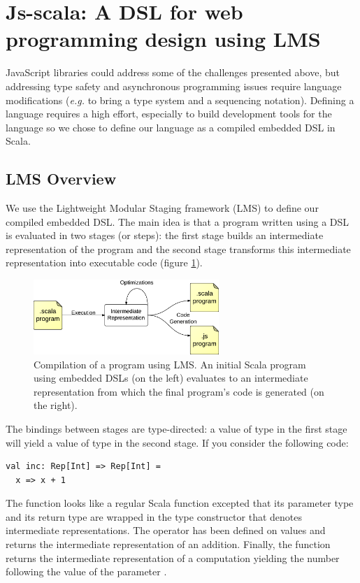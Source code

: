 \documentclass[runningheads,a4paper]{llncs}
\newcommand{\eg}{\emph{e.g.}}
\begin{document}
\section{Js-scala: A DSL for web programming design using LMS}


JavaScript libraries could address some of the challenges presented above, but addressing type safety and
asynchronous programming issues require language modifications (\eg{} to bring a type system and a sequencing
notation). Defining a language requires a high effort, especially to build development tools for the language so we
chose to define our language as a compiled embedded DSL in Scala.


\subsection{LMS Overview}

We use the Lightweight Modular Staging framework (LMS) to define our compiled embedded DSL. The main idea is that a
program written using a DSL is evaluated in two stages (or steps): the first stage builds an intermediate
representation of the program and the second stage transforms this intermediate representation into executable code
(figure \ref{lms-diagram}).

\begin{figure}
  \centering
  \includegraphics[width=7cm]{lms.pdf}
  \caption{Compilation of a program using LMS. An initial Scala program using embedded DSLs (on the left) evaluates
  to an intermediate representation from which the final program’s code is generated (on the right).}
  \label{lms-diagram}
\end{figure}

The bindings between stages are type-directed: a value of type  in the first stage will yield a value
of type  in the second stage. If you consider the following code:
\begin{lstlisting}
val inc: Rep[Int] => Rep[Int] =
  x => x + 1
\end{lstlisting}
The function looks like
a regular Scala function excepted that its parameter type and its return type are wrapped in the  type
constructor that denotes intermediate representations. The \code{+} operator has been defined on 
values and returns the intermediate representation of an addition. Finally, the  function returns the
intermediate representation of a computation yielding the number following the value of the parameter .
\end{document}
